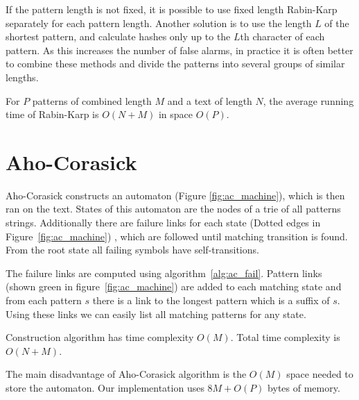 \documentclass[final]{beamer}
\begin{document}
\begin{poster}
If the pattern length is not fixed, it is possible to use fixed length Rabin-Karp separately for each pattern length. Another solution is to use the length $L$ of the shortest pattern, and calculate hashes only up to the $L$th character of each pattern. As this increases the number of false alarms, in practice it is often better to combine these methods and divide the patterns into several groups of similar lengths.

For $P$ patterns of combined length $M$  and a text of length $N$, the average running time of Rabin-Karp is $O(N+M)$ in space $O(P)$.


\section{Aho-Corasick}

Aho-Corasick constructs an automaton (Figure \ref{fig:ac_machine}), which is then ran on the text.
States of this automaton are the nodes of a trie of all patterns strings.
Additionally there are failure links for each state (Dotted edges in Figure~\ref{fig:ac_machine})
, which are followed until matching transition is found. From the root state all failing symbols
have self-transitions.

\newcolumn

The failure links are computed using algorithm~\ref{alg:ac_fail}.
Pattern links (shown green in figure~\ref{fig:ac_machine}) are added to each
matching state and from each pattern $s$ there is a link to the longest pattern which
is a suffix of $s$.
Using these links we can easily list all matching patterns for
any state.

Construction algorithm has time complexity $O(M)$. Total time complexity is $O(N+M)$.

\vspace{5mm}

The main disadvantage of Aho-Corasick algorithm is the $O(M)$ space needed to store the automaton.
Our implementation uses $8M+O(P)$ bytes of memory.

%


\end{poster}
\end{document}
